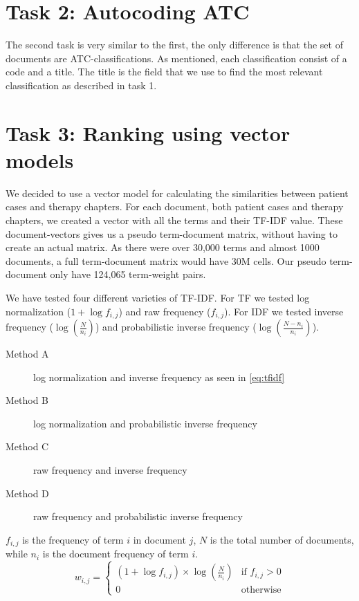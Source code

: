 \section{Task 2: Autocoding ATC}
The second task is very similar to the first, the only difference is that the set of documents are ATC-classifications. As mentioned, each classification consist of a code and a title. The title is the field that we use to find the most relevant classification as described in task 1.


\section{Task 3: Ranking using vector models}
\label{sec:task3}
We decided to use a vector model for calculating the similarities between
patient cases and therapy chapters. For each document, both patient cases
and therapy chapters, we created a vector with all the terms and their
TF-IDF value. These document-vectors gives us a pseudo term-document matrix,
without having to create an actual matrix. As there were over 30,000 terms
and almost 1000 documents, a full term-document matrix would have 30M cells.
Our pseudo term-document only have 124,065 term-weight pairs.

We have tested four different varieties of TF-IDF. For TF we tested log
normalization (\( 1 + \log f_{i,j} \)) and raw frequency (\( f_{i,j} \)).
For IDF we tested inverse frequency (\( \log(\frac{N}{n_{i}}) \)) and
probabilistic inverse frequency (\( \log(\frac{N - n_{i}}{n_{i}}) \)).
\begin{description}
	\item[Method A] log normalization and inverse frequency as seen in \autoref{eq:tfidf}
	\item[Method B] log normalization and probabilistic inverse frequency
	\item[Method C] raw frequency and inverse frequency
	\item[Method D] raw frequency and probabilistic inverse frequency
\end{description}
\( f_{i,j} \) is the frequency of term \( i \) in document
\( j \), \( N \) is the total number of documents, while \( n_{i} \) is the
document frequency of term \( i \).
\begin{equation} \label{eq:tfidf}
	w_{i,j} =
	\begin{cases}
		(1 + \log f_{i,j}) \times \log(\frac{N}{n_{i}}) & \text{if } f_{i,j} > 0 \\
		0												& \text{otherwise}
	\end{cases}
\end{equation}

